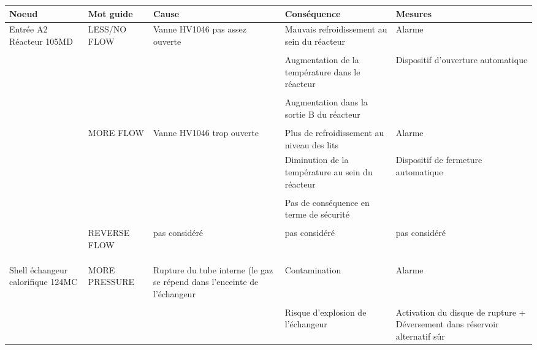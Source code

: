 \documentclass[10pt,a4paper]{article}
\begin{document}
\begin{landscape}
\begin{table}
\centering

\begin{tabular}{|p{2cm}|p{3cm}|p{4cm}|p{6cm}|p{5cm}|}
\hline 
Noeud & Mot guide & Cause & Conséquence & Mesures \\ 
\hline 
\hline

 Entrée A2 Réacteur 105MD & LESS/NO FLOW & Vanne HV1046 pas assez ouverte & Mauvais refroidissement au sein du
 réacteur & Alarme \\ 

 & & & & \\

 & & & Augmentation de la température dans le réacteur & Dispositif d'ouverture automatique \\ 
 
 & & & & \\

 & & & Augmentation dans la sortie B du réacteur &  \\ 
 
 & & & & \\
 
 & MORE FLOW & Vanne HV1046 trop ouverte & Plus de refroidissement au niveau des lits & Alarme \\
 
 & & & Diminution de la température au sein du réacteur & Dispositif de fermeture automatique \\
 
 & & & & \\
 
 & & & Pas de conséquence en terme de sécurité & \\
 
 & & & & \\
  
 & REVERSE FLOW & pas considéré & pas considéré & pas considéré \\
  
  
 & & & & \\
 & & & & \\
 & & & & \\

 Shell échangeur calorifique 124MC & MORE PRESSURE & Rupture du tube interne (le gaz se répend dans l'enceinte de
 l'échangeur & Contamination & Alarme \\
 
  & & & & \\

  & & & Risque d'explosion de l'échangeur  & Activation du disque de rupture + Déversement dans réservoir alternatif sûr \\
 

\end{tabular}
\end{table}
\end{landscape}
\end{document}
